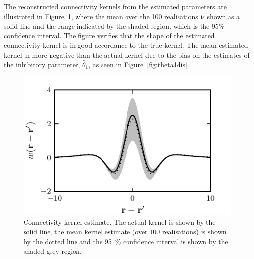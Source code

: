 \documentclass[10pt,a4paper]{article}
\begin{document}
The reconstructed connectivity kernels from the estimated parameters are illustrated in Figure~\ref{fig:KernelEstimates}, where the mean over the 100 realisations is shown as a solid line and the range indicated by the shaded region, which is  the $95\%$ confidence interval. The figure verifies that the shape of the estimated connectivity kernel is in good accordance to the true kernel. The mean estimated kernel in more negative than the actual kernel due to the bias on the estimates of the inhibitory parameter, $\hat\theta_1$, as seen in Figure~\ref{fig:theta1dis}.
\begin{figure}
    \centering
\includegraphics{./Graph/KernelEstimate.pdf}%
\caption{Connectivity kernel estimate. The actual kernel is shown by the solid line, the mean kernel estimate (over 100 realisations) is shown by the dotted line and the 95~\% confidence interval is shown by the shaded grey region.}
\label{fig:KernelEstimates}
\end{figure}
\end{document}
